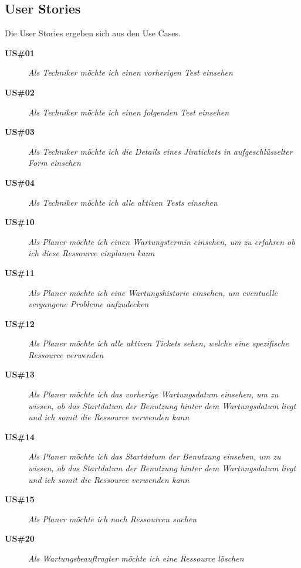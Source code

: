\subsection{User Stories}
Die User Stories ergeben sich aus den Use Cases.

\begin{description}
    \item[\textbf{US\#01}]\textit{Als Techniker möchte ich einen vorherigen Test
    einsehen}

    \item[\textbf{US\#02}]\textit{Als Techniker möchte ich einen folgenden Test
    einsehen}

    \item[\textbf{US\#03}]\textit{Als Techniker möchte ich die Details eines Jiratickets
    in aufgeschlüsselter Form einsehen}

    \item[\textbf{US\#04}]\textit{Als Techniker möchte ich alle aktiven Tests einsehen}

    \item[\textbf{US\#10}]\textit{Als Planer möchte ich einen Wartungstermin einsehen, um zu erfahren
    ob ich diese Ressource einplanen kann}

    \item[\textbf{US\#11}]\textit{Als Planer möchte ich eine Wartungshistorie einsehen, um eventuelle
    vergangene Probleme aufzudecken}

    \item[\textbf{US\#12}]\textit{Als Planer möchte ich alle aktiven Tickets sehen, 
    welche eine spezifische Ressource verwenden}

    \item[\textbf{US\#13}]\textit{Als Planer möchte ich das vorherige Wartungsdatum einsehen, 
    um zu wissen, ob das Startdatum der Benutzung hinter dem Wartungsdatum liegt
    und ich somit die Ressource verwenden kann}

    \item[\textbf{US\#14}]\textit{Als Planer möchte ich das Startdatum der Benutzung einsehen,
    um zu wissen, ob das Startdatum der Benutzung hinter dem Wartungsdatum liegt
    und ich somit die Ressource verwenden kann }

    \item[\textbf{US\#15}]\textit{Als Planer möchte ich nach Ressourcen suchen}

    \item[\textbf{US\#20}]\textit{Als Wartungsbeauftragter möchte ich eine Ressource löschen}


\end{description}
